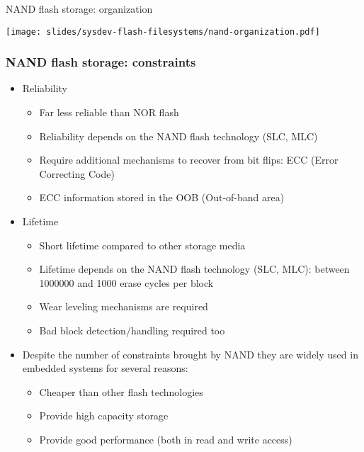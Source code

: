 \begin{frame}{NAND flash storage: organization}
  \begin{center}
    \texttt{[image: slides/sysdev-flash-filesystems/nand-organization.pdf]}
  \end{center}
\end{frame}

\begin{frame}
  \frametitle{NAND flash storage: constraints}
  \begin{itemize}
  \item Reliability
    \begin{itemize}
    \item Far less reliable than NOR flash
    \item Reliability depends on the NAND flash technology (SLC, MLC)
    \item Require additional mechanisms to recover from bit flips: ECC
      (Error Correcting Code)
    \item ECC information stored in the OOB (Out-of-band area)
    \end{itemize}
  \item Lifetime
    \begin{itemize}
    \item Short lifetime compared to other storage media
    \item Lifetime depends on the NAND flash technology (SLC, MLC):
      between 1000000 and 1000 erase cycles per block
    \item Wear leveling mechanisms are required
    \item Bad block detection/handling required too
    \end{itemize}
  \item Despite the number of constraints brought by NAND they are
    widely used in embedded systems for several reasons:
    \begin{itemize}
    \item Cheaper than other flash technologies
    \item Provide high capacity storage
    \item Provide good performance (both in read and write access)
    \end{itemize}
  \end{itemize}
\end{frame}

